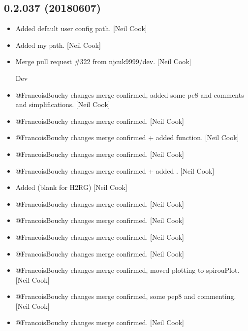 \documentclass[a4paper,10pt,english]{report}
\begin{document}
\subsection{0.2.037 (2018\sphinxhyphen{}06\sphinxhyphen{}07)}
\label{\detokenize{misc/changelog:id446}}\begin{itemize}
\item {} 
Added default user config path. {[}Neil Cook{]}

\item {} 
Added my path. {[}Neil Cook{]}

\item {} 
Merge pull request \#322 from njcuk9999/dev. {[}Neil Cook{]}

Dev

\item {} 
@FrancoisBouchy changes \sphinxhyphen{} merge confirmed, added some pe8 and comments
and simplifications. {[}Neil Cook{]}

\item {} 
@FrancoisBouchy changes \sphinxhyphen{} merge confirmed. {[}Neil Cook{]}

\item {} 
@FrancoisBouchy changes \sphinxhyphen{} merge confirmed + added 
function. {[}Neil Cook{]}

\item {} 
@FrancoisBouchy changes \sphinxhyphen{} merge confirmed. {[}Neil Cook{]}

\item {} 
@FrancoisBouchy changes \sphinxhyphen{} merge confirmed + added
. {[}Neil Cook{]}

\item {} 
Added  (blank for H2RG) {[}Neil Cook{]}

\item {} 
@FrancoisBouchy changes \sphinxhyphen{} merge confirmed. {[}Neil Cook{]}

\item {} 
@FrancoisBouchy changes \sphinxhyphen{} merge confirmed. {[}Neil Cook{]}

\item {} 
@FrancoisBouchy changes \sphinxhyphen{} merge confirmed. {[}Neil Cook{]}

\item {} 
@FrancoisBouchy changes \sphinxhyphen{} merge confirmed. {[}Neil Cook{]}

\item {} 
@FrancoisBouchy changes \sphinxhyphen{} merge confirmed, moved plotting to
spirouPlot. {[}Neil Cook{]}

\item {} 
@FrancoisBouchy changes \sphinxhyphen{} merge confirmed, some pep8 and commenting.
{[}Neil Cook{]}

\item {} 
@FrancoisBouchy changes \sphinxhyphen{} merge confirmed. {[}Neil Cook{]}

\end{itemize}
\end{document}
